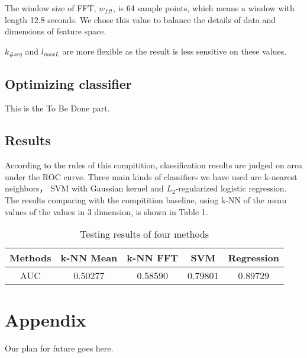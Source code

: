 \documentclass{article} %
\begin{document}
The window size of FFT, $w_{fft}$, is 64 sample points, which means a window with length 12.8 seconds. We chose this value to balance the details of data and dimensions of feature space. 

$k_{\#seq}$ and  $l_{maxL}$ are more flexible as the result is less sensitive on these values.

\subsection{Optimizing classifier}
This is the To Be Done part.

\subsection{Results}

According to the rules of this compitition, classification results are judged on area under the ROC curve. Three main kinds of classifiers we have used are k-nearest neighbors， SVM with Gaussian kernel and $L_2$-regularized logistic regression. The results comparing with the compitition baseline, using k-NN of the mean values of the values in 3 dimension, is shown in Table 1.

\begin{table}[!ht]
\caption{Testing results of four methods}
	\begin{center}
		\begin{tabular}{ c | c  c  c  c }
			\hline
			 Methods & k-NN Mean & k-NN FFT & SVM & Regression \\
			 \hline
			 AUC & 0.50277 & 0.58590 & 0.79801 & 0.89729 \\
			 \hline
		\end{tabular}
	\end{center}
\end{table}

\section*{Appendix}

Our plan for future goes here.




\end{document}
